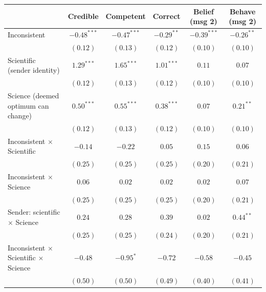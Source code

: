 
\begin{table}
\begin{center}
\begin{tabular}{l c c c c c}
\hline
 & Credible & Competent & Correct & Belief (msg 2) & Behave (msg 2) \\
\hline
Inconsistent                                      & $-0.48^{***}$ & $-0.47^{***}$ & $-0.29^{**}$ & $-0.39^{***}$ & $-0.26^{**}$ \\
                                                  & $(0.12)$      & $(0.13)$      & $(0.12)$     & $(0.10)$      & $(0.10)$     \\
Scientific (sender identity)                      & $1.29^{***}$  & $1.65^{***}$  & $1.01^{***}$ & $0.11$        & $0.07$       \\
                                                  & $(0.12)$      & $(0.13)$      & $(0.12)$     & $(0.10)$      & $(0.10)$     \\
Science (deemed optimum can change)               & $0.50^{***}$  & $0.55^{***}$  & $0.38^{***}$ & $0.07$        & $0.21^{**}$  \\
                                                  & $(0.12)$      & $(0.13)$      & $(0.12)$     & $(0.10)$      & $(0.10)$     \\
Inconsistent $\times$ Scientific                  & $-0.14$       & $-0.22$       & $0.05$       & $0.15$        & $0.06$       \\
                                                  & $(0.25)$      & $(0.25)$      & $(0.25)$     & $(0.20)$      & $(0.21)$     \\
Inconsistent $\times$ Science                     & $0.06$        & $0.02$        & $0.02$       & $0.02$        & $0.07$       \\
                                                  & $(0.25)$      & $(0.25)$      & $(0.25)$     & $(0.20)$      & $(0.21)$     \\
Sender: scientific $\times$ Science               & $0.24$        & $0.28$        & $0.39$       & $0.02$        & $0.44^{**}$  \\
                                                  & $(0.25)$      & $(0.25)$      & $(0.24)$     & $(0.20)$      & $(0.21)$     \\
Inconsistent $\times$ Scientific $\times$ Science & $-0.48$       & $-0.95^{*}$   & $-0.72$      & $-0.58$       & $-0.45$      \\
                                                  & $(0.50)$      & $(0.50)$      & $(0.49)$     & $(0.40)$      & $(0.41)$     \\

\end{tabular}
\end{center}
\end{table}

